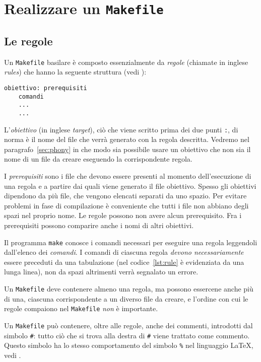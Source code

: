 \cleardoublepage
\chapter{Realizzare un \texttt{Makefile}}
\label{cha:realizzare-makefile}

\section{Le regole}
\label{sec:le-regole}

Un \verb|Makefile| basilare è composto essenzialmente da \emph{regole} (chiamate
in inglese \emph{rules}) che hanno la seguente struttura (vedi
\textcite[3]{gnu:make}):
\begin{lstlisting}[showtabs=true,tab=\rightarrowfill,caption={Struttura di una
regola},label=lst:rule]
obiettivo: prerequisiti
	comandi
	...
	...
\end{lstlisting}
L'\emph{obiettivo} (in inglese \emph{target}), ciò che viene scritto prima dei
due punti \verb|:|, di norma è il nome del file che verrà generato con la regola
descritta.  Vedremo nel paragrafo~\ref{sec:phony} in che modo sia possibile
usare un obiettivo che non sia il nome di un file da creare eseguendo la
corrispondente regola.

I \emph{prerequisiti} sono i file che devono essere presenti al momento
dell'esecuzione di una regola e a partire dai quali viene generato il file
obiettivo.  Spesso gli obiettivi dipendono da più file, che vengono elencati
separati da uno spazio.  Per evitare problemi in fase di compilazione è
conveniente che tutti i file non abbiano degli spazi nel proprio nome.  Le
regole possono non avere alcun prerequisito.  Fra i prerequisiti possono
comparire anche i nomi di altri obiettivi.

Il programma \verb|make| conosce i comandi necessari per eseguire una regola
leggendoli dall'elenco dei \emph{comandi}.  I comandi di ciascuna regola
\emph{devono necessariamente} essere preceduti da una tabulazione (nel
codice~\ref{lst:rule} è evidenziata da una lunga linea), non da spazi altrimenti
verrà segnalato un errore.

Un \verb|Makefile| deve contenere almeno una regola, ma possono essercene anche
più di una, ciascuna corrispondente a un diverso file da creare, e l'ordine con
cui le regole compaiono nel \verb|Makefile| \emph{non} è importante.

Un \verb|Makefile| può contenere, oltre alle regole, anche dei commenti,
introdotti dal simbolo \verb|#|: tutto ciò che si trova alla destra di \verb|#|
viene trattato come commento.  Questo simbolo ha lo stesso comportamento del
simbolo \verb|%| nel linguaggio \LaTeX{}, vedi \textcite[26]{pantieri:latex}.

